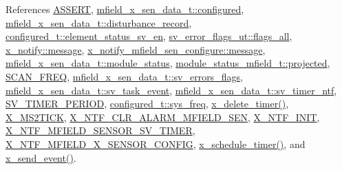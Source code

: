 References \hyperlink{a00072_source_l00059}{A\+S\+S\+E\+R\+T}, \hyperlink{a00025_source_l00036}{mfield\+\_\+x\+\_\+sen\+\_\+data\+\_\+t\+::configured}, \hyperlink{a00025_source_l00041}{mfield\+\_\+x\+\_\+sen\+\_\+data\+\_\+t\+::disturbance\+\_\+record}, \hyperlink{a00021_source_l00205}{configured\+\_\+t\+::element\+\_\+status\+\_\+sv\+\_\+en}, \hyperlink{a00022_source_l00044}{sv\+\_\+error\+\_\+flags\+\_\+ut\+::flags\+\_\+all}, \hyperlink{a00036_source_l00075}{x\+\_\+notify\+::message}, \hyperlink{a00019_ae926905663cb8ca01f1bc2d670e428f5}{x\+\_\+notify\+\_\+mfield\+\_\+sen\+\_\+configure\+::message}, \hyperlink{a00025_source_l00045}{mfield\+\_\+x\+\_\+sen\+\_\+data\+\_\+t\+::module\+\_\+status}, \hyperlink{a00019_af2267fb093fb5dcaa006a570a6da3b6b}{module\+\_\+status\+\_\+mfield\+\_\+t\+::projected}, \hyperlink{a00021_source_l00096}{S\+C\+A\+N\+\_\+\+F\+R\+E\+Q}, \hyperlink{a00025_source_l00051}{mfield\+\_\+x\+\_\+sen\+\_\+data\+\_\+t\+::sv\+\_\+errors\+\_\+flags}, \hyperlink{a00025_source_l00029}{mfield\+\_\+x\+\_\+sen\+\_\+data\+\_\+t\+::sv\+\_\+task\+\_\+event}, \hyperlink{a00025_source_l00032}{mfield\+\_\+x\+\_\+sen\+\_\+data\+\_\+t\+::sv\+\_\+timer\+\_\+ntf}, \hyperlink{a00023_source_l00020}{S\+V\+\_\+\+T\+I\+M\+E\+R\+\_\+\+P\+E\+R\+I\+O\+D}, \hyperlink{a00021_source_l00192}{configured\+\_\+t\+::sys\+\_\+freq}, \hyperlink{a00037_source_l00482}{x\+\_\+delete\+\_\+timer()}, \hyperlink{a00036_source_l00048}{X\+\_\+\+M\+S2\+T\+I\+C\+K}, \hyperlink{a00021_source_l00177}{X\+\_\+\+N\+T\+F\+\_\+\+C\+L\+R\+\_\+\+A\+L\+A\+R\+M\+\_\+\+M\+F\+I\+E\+L\+D\+\_\+\+S\+E\+N}, \hyperlink{a00036_source_l00030}{X\+\_\+\+N\+T\+F\+\_\+\+I\+N\+I\+T}, \hyperlink{a00025_source_l00015}{X\+\_\+\+N\+T\+F\+\_\+\+M\+F\+I\+E\+L\+D\+\_\+\+S\+E\+N\+S\+O\+R\+\_\+\+S\+V\+\_\+\+T\+I\+M\+E\+R}, \hyperlink{a00019_source_l00011}{X\+\_\+\+N\+T\+F\+\_\+\+M\+F\+I\+E\+L\+D\+\_\+\+X\+\_\+\+S\+E\+N\+S\+O\+R\+\_\+\+C\+O\+N\+F\+I\+G}, \hyperlink{a00037_source_l00456}{x\+\_\+schedule\+\_\+timer()}, and \hyperlink{a00037_source_l00381}{x\+\_\+send\+\_\+event()}.


